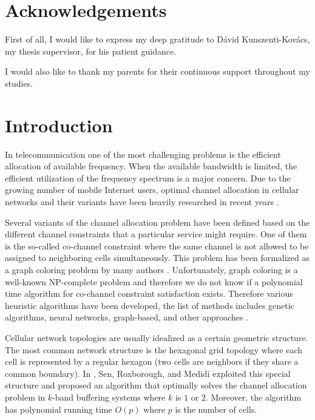 \documentclass[a4paper, 12pt]{article}
\begin{document}
\pagebreak
{}
\section*{Acknowledgements}
First of all, I would like to express my deep gratitude to Dávid Kunszenti-Kovács, my thesis supervisor, for his patient guidance.

I would also like to thank my parents for their continuous support throughout my studies.
\newpage
\tableofcontents
\newpage
{}
\section{Introduction}
In telecommunication one of the most challenging problems is the efficient allocation of available frequency. When the available bandwidth is limited, the efficient utilization of the frequency spectrum is a major concern. Due to the growing number of mobile Internet users, optimal channel allocation in cellular networks and their variants have been heavily researched in recent years \cite{Audhya:2011:SCA:1988563.1988571}.

Several variants of the channel allocation problem have been defined based on the different channel constraints that a particular service might require. One of them is the so-called co-channel constraint where the same channel is not allowed to be assigned to neighboring cells simultaneously. This problem has been formalized as a graph coloring problem by many authors \cite{1456167}. Unfortunately, graph coloring is a well-known NP-complete problem \cite{Kar72} and therefore we do not know if a polynomial time algorithm for co-channel constraint satisfaction exists. Therefore various heuristic algorithms have been developed, the list of methods includes genetic algorithms, neural networks, graph-based, and other approaches \cite{Audhya:2011:SCA:1988563.1988571}.

Cellular network topologies are usually idealized as a certain geometric structure. The most common network structure is the hexagonal grid topology where each cell is represented by a regular hexagon (two cells are neighbors if they share a common boundary). In \cite{662943}, Sen, Roxborough, and Medidi exploited this special structure and proposed an algorithm that optimally solves the channel allocation problem in $k$-band buffering systems where $k$ is $1$ or $2$. Moreover, the algorithm has polynomial running time $O(p)$ where $p$ is the number of cells.
\end{document}
